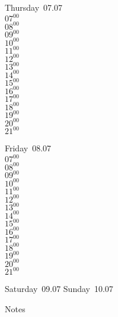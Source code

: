\documentclass[11pt,a4paper]{book}\usepackage[]{graphicx}\usepackage[]{color}
\begin{document}
\clearpage
\begin{headerbox}
\end{headerbox}
\begin{weekdaybox}
  Thursday~07.07\\
  { 
  \vfill
  $07^{00}$\\
$08^{00}$\\
$09^{00}$\\
$10^{00}$\\
$11^{00}$\\
$12^{00}$\\
$13^{00}$\\
$14^{00}$\\
$15^{00}$\\
$16^{00}$\\
$17^{00}$\\
$18^{00}$\\
$19^{00}$\\
$20^{00}$\\
$21^{00}$\\
  }
\end{weekdaybox} 
\begin{weekdaybox}
  Friday~08.07\\
  { 
  \vfill
  $07^{00}$\\
$08^{00}$\\
$09^{00}$\\
$10^{00}$\\
$11^{00}$\\
$12^{00}$\\
$13^{00}$\\
$14^{00}$\\
$15^{00}$\\
$16^{00}$\\
$17^{00}$\\
$18^{00}$\\
$19^{00}$\\
$20^{00}$\\
$21^{00}$\\
  }
\end{weekdaybox}
\begin{weekendbox}
  Saturday~09.07
  \tcblower
  Sunday~10.07
\end{weekendbox} %
\begin{notebox}
  Notes
\end{notebox}
\clearpage
\end{document}

